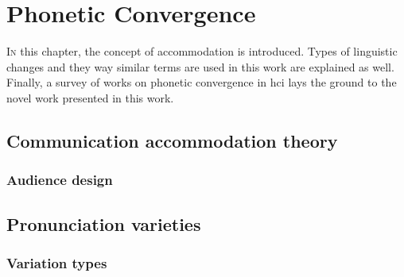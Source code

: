 \chapter{Phonetic Convergence}
\label{chap:phonetic_convergence}

\lettrine{I}{n} this chapter, the concept of accommodation is introduced.
Types of linguistic changes and they way similar terms are used in this work are explained as well.
Finally, a survey of works on phonetic convergence in \acl{hci} lays the ground to the novel work presented in this work.

\pagebreak

\section{Communication accommodation theory}
\label{sec:communication_accommodation_theory}

\subsection{Audience design}
\label{subsec:audience_design}


\section{Pronunciation varieties}
\label{sec:pronunciation_varieties}


\subsection{Variation types}
\label{subsec:variation_types}

